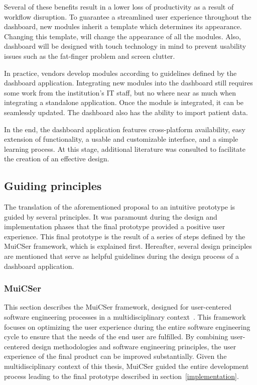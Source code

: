     \noindent Several of these benefits result in a lower loss of productivity as a result of workflow disruption. To guarantee a streamlined user experience throughout the dashboard, new modules inherit a template which determines its appearance. Changing this template, will change the appearance of all the modules. Also, dashboard will be designed with touch technology in mind to prevent usability issues such as the fat-finger problem and screen clutter. 
 
    In practice, vendors develop modules according to guidelines defined by the dashboard application. Integrating new modules into the dashboard still requires some work from the institution's IT staff, but no where near as much when integrating a standalone application. Once the module is integrated, it can be seamlessly updated. The dashboard also has the ability to import patient data.\bigskip

    \noindent In the end, the dashboard application features cross-platform availability, easy extension of functionality, a usable and customizable interface, and a simple learning process. At this stage, additional literature was consulted to facilitate the creation of an effective design.

    \subsection{Guiding principles}\label{guiding_principles}

    The translation of the aforementioned proposal to an intuitive prototype is guided by several principles. It was paramount during the design and implementation phases that the final prototype provided a positive user experience. This final prototype is the result of a series of steps defined by the MuiCSer framework, which is explained first. Hereafter, several design principles are mentioned that serve as helpful guidelines during the design process of a dashboard application.

        \subsubsection{MuiCSer}\label{muicser}
        This section describes the MuiCSer framework, designed for user-centered software engineering processes in a multidisciplinary context~\cite{Haesen2008}. This framework focuses on optimizing the user experience during the entire software engineering cycle to ensure that the needs of the end user are fulfilled. By combining user-centered design methodologies and software engineering principles, the user experience of the final product can be improved substantially. Given the multidisciplinary context of this thesis, MuiCSer guided the entire development process leading to the final prototype described in section~\ref{implementation}.
        
